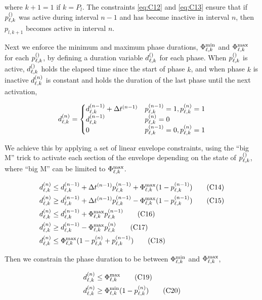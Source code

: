 where $k+1=1$ if $k=P_l$. The constraints \ref{eq:C12} and \ref{eq:C13} ensure
that if $\p[]{\ell}{k}$ was active during interval $n-1$ and has become inactive
in interval $n$, then $p_{l,k+1}$ becomes active in interval $n$.

Next we enforce the minimum and maximum phase durations, $\PTMIN{\ell}{k}$ and
$\PTMAX{\ell}{k}$ for each $\p[]{\ell}{k}$, by defining a duration variable
$\pd[]{\ell}{k}$ for each phase. When $\p[]{\ell}{k}$ is active,
$\pd[]{\ell}{k}$ holds the elapsed time since the start of phase $k$, and when
phase $k$ is inactive $\pd{\ell}{k}$ is constant and holds the duration of the
last phase until the next activation,

\begin{equation}
\pd{\ell}{k} = 
\begin{cases}
\pd[n-1]{\ell}{k} + \DT[n-1] & \p[n-1]{\ell}{k}=1,\p{\ell}{k}=1\\
\pd[n-1]{\ell}{k} & \p{\ell}{k}=0\\
0 & \p[n-1]{\ell}{k}=0,\p{\ell}{k}=1
\end{cases}
\end{equation}

We achieve this by applying a set of linear envelope constraints, using the
``big M'' trick to activate each section of the envelope depending on the state
of $\p[]{\ell}{k}$, where ``big M'' can be limited to $\PTMAX{\ell}{k}$.

\begin{align}
\pd{\ell}{k} &\le \pd[n-1]{\ell}{k} + \DT[n-1] \p[n-1]{\ell}{k} + \PTMAX{\ell}{k} (1 - \p[n-1]{\ell}{k})\tag{C14}\label{eq:C14}\\
\pd{\ell}{k} &\ge \pd[n-1]{\ell}{k} + \DT[n-1] \p[n-1]{\ell}{k} - \PTMAX{\ell}{k} (1 - \p[n-1]{\ell}{k})\tag{C15}\label{eq:C15}\\
\pd{\ell}{k} &\le \pd[n-1]{\ell}{k} + \PTMAX{\ell}{k} \p[n-1]{\ell}{k}\tag{C16}\label{eq:C16}\\
\pd{\ell}{k} &\ge \pd[n-1]{\ell}{k} - \PTMAX{\ell}{k} \p{\ell}{k}\tag{C17}\label{eq:C17}\\
\pd{\ell}{k} &\le \PTMAX{\ell}{k}(1 - \p{\ell}{k} + \p[n-1]{\ell}{k})\tag{C18}\label{eq:C18}
\end{align}

Then we constrain the phase duration to be between $\PTMIN{\ell}{k}$ and $\PTMAX{\ell}{k}$,

\begin{align}
\pd{\ell}{k} &\le \PTMAX{\ell}{k}\tag{C19}\label{eq:C19}\\
\pd{\ell}{k} &\ge \PTMIN{\ell}{k}(1 - \p{\ell}{k})\tag{C20}\label{eq:C20}
\end{align}

